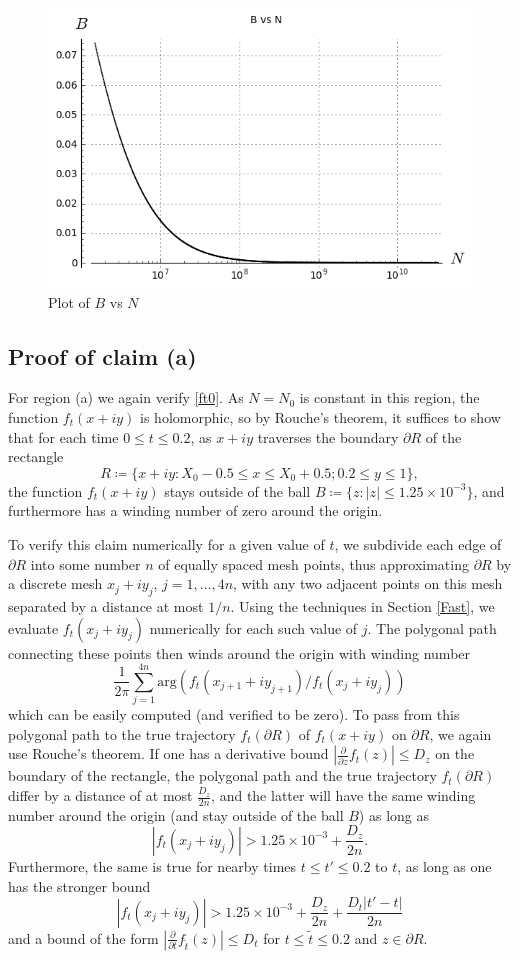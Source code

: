\begin{figure}[h!]
  \includegraphics[width=0.7\linewidth]{B_vs_N.png}
  \caption{Plot of $B$ vs $N$}
\end{figure}


\subsection{Proof of claim (a)}

For region (a) we again verify \eqref{ft0}.
As $N = N_0$ is constant in this region, the function $f_t(x+iy)$ is holomorphic, so by Rouche's theorem, it suffices to show that for each time $0 \leq t \leq 0.2$, as $x+iy$ traverses the boundary $\partial R$ of the rectangle 
$$ R \coloneqq \{ x+iy: X_0 - 0.5 \leq x \leq X_0 + 0.5; 0.2 \leq y \leq 1 \},$$
the function $f_t(x+iy)$ stays outside of the ball $B \coloneqq \{ z: |z| \leq 1.25 \times 10^{-3} \}$, and furthermore has a winding number of zero around the origin.

To verify this claim numerically for a given value of $t$, we subdivide each edge of $\partial R$ into some number $n$ of equally spaced mesh points, thus approximating $\partial R$ by a discrete mesh $x_j+iy_j$, $j=1,\dots,4n$, with any two adjacent points on this mesh separated by a distance at most $1/n$.  Using the techniques in Section \ref{Fast}, we evaluate $f_t(x_j+iy_j)$ numerically for each such value of $j$.  The polygonal path connecting these points then winds around the origin with winding number
$$ \frac{1}{2\pi} \sum_{j=1}^{4n} \mathrm{arg}( f_t(x_{j+1}+iy_{j+1}) / f_t(x_j + i y_j) )$$
which can be easily computed (and verified to be zero).  To pass from this polygonal path to the true trajectory $f_t(\partial R)$ of $f_t(x+iy)$ on $\partial R$, we again use Rouche's theorem.  If one has a derivative bound $|\frac{\partial}{\partial z} f_t(z)| \leq D_z$ on the boundary of the rectangle, the polygonal path and the true trajectory $f_t(\partial R)$ differ by a distance of at most $\frac{D_z}{2n}$, and the latter will have the same winding number around the origin (and stay outside of the ball $B$) as long as
$$ |f_t(x_j + iy_j)| > 1.25 \times 10^{-3} + \frac{D_z}{2n}.$$
Furthermore, the same is true for nearby times $t \leq t' \leq 0.2$ to $t$, as long as one has the stronger bound
\begin{equation}\label{cond}
 |f_t(x_j + iy_j)| > 1.25 \times 10^{-3} + \frac{D_z}{2n} + \frac{D_t |t'-t|}{2n}
\end{equation}
and a bound of the form $|\frac{\partial}{\partial t} f_{\tilde t}(z)| \leq D_t$
for $t \leq \tilde t \leq 0.2$ and $z \in \partial R$.


